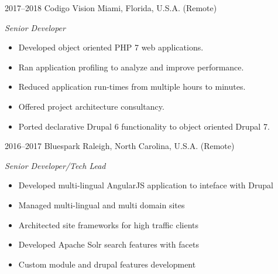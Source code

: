 \documentclass[]{friggeri-cv} %
\begin{document}
\begin{entrylist}

\entry
{2017--2018}
{Codigo Vision}
{Miami, Florida, U.S.A. (Remote)}
{\emph{Senior Developer}
\begin{itemize}
\item Developed object oriented PHP 7 web applications.
\item Ran application profiling to analyze and improve performance.
\item Reduced application run-times from multiple hours to minutes.
\item Offered project architecture consultancy.
\item Ported declarative Drupal 6 functionality to object oriented Drupal 7.

\end{itemize}}

\entry
{2016--2017}
{Bluespark}
{Raleigh, North Carolina, U.S.A. (Remote)}
{\emph{Senior Developer/Tech Lead}
\begin{itemize}
\item Developed multi-lingual AngularJS application to inteface with Drupal
\item Managed multi-lingual and multi domain sites
\item Architected site frameworks for high traffic clients
\item Developed Apache Solr search features with facets
\item Custom module and drupal features development
\end{itemize}}


\end{entrylist}
\end{document}
